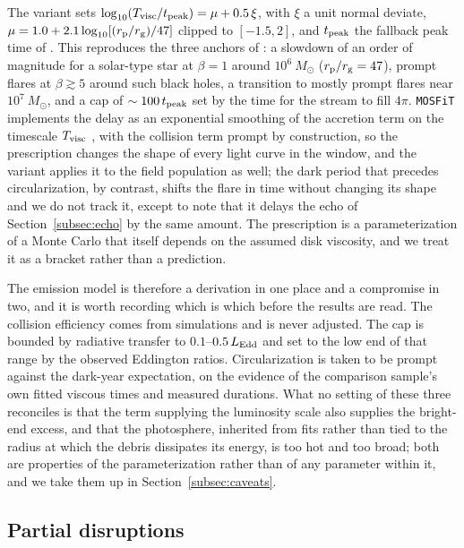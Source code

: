 \documentclass[twocolumn,pdftex]{aastex701}
\newcommand{\msun}{M_{\odot}\xspace}
\newcommand{\mosfit}{{\tt MOSFiT}\xspace}
\begin{document}
The variant sets $\log_{10}(T_{\rm visc}/t_{\rm peak}) = \mu + 0.5\,\xi$, with $\xi$ a unit normal deviate, $\mu = 1.0 + 2.1 \log_{10}[(r_{\rm p}/r_{\rm g})/47]$ clipped to $[-1.5, 2]$, and $t_{\rm peak}$ the fallback peak time of \citet{Guillochon:2013a}. This reproduces the three anchors of \citet{Guillochon:2015a}: a slowdown of an order of magnitude for a solar-type star at $\beta = 1$ around $10^{6}~\msun$ ($r_{\rm p}/r_{\rm g} = 47$), prompt flares at $\beta \gtrsim 5$ around such black holes, a transition to mostly prompt flares near $10^{7}~\msun$, and a cap of $\sim 100\, t_{\rm peak}$ set by the time for the stream to fill $4\pi$. \mosfit implements the delay as an exponential smoothing of the accretion term on the timescale $T_{\rm visc}$ \citep{Mockler:2019a}, with the collision term prompt by construction, so the prescription changes the shape of every light curve in the window, and the variant applies it to the field population as well; the dark period that precedes circularization, by contrast, shifts the flare in time without changing its shape and we do not track it, except to note that it delays the echo of Section~\ref{subsec:echo} by the same amount. The prescription is a parameterization of a Monte Carlo that itself depends on the assumed disk viscosity, and we treat it as a bracket rather than a prediction.

The emission model is therefore a derivation in one place and a compromise in two, and it is worth recording which is which before the results are read. The collision efficiency comes from simulations and is never adjusted. The cap is bounded by radiative transfer to $0.1$--$0.5\, L_{\rm Edd}$ and set to the low end of that range by the observed Eddington ratios. Circularization is taken to be prompt against the dark-year expectation, on the evidence of the comparison sample's own fitted viscous times and measured durations. What no setting of these three reconciles is that the term supplying the luminosity scale also supplies the bright-end excess, and that the photosphere, inherited from fits rather than tied to the radius at which the debris dissipates its energy, is too hot and too broad; both are properties of the parameterization rather than of any parameter within it, and we take them up in Section~\ref{subsec:caveats}.

\subsection{Partial disruptions}\label{subsec:partial}
\end{document}
